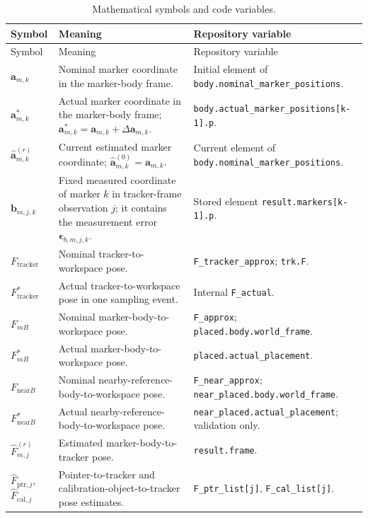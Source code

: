 \documentclass[11pt]{article}
\newcommand{\vct}[1]{\bm{#1}}
\begin{document}
\begingroup\small
\begin{longtable}{p{}p{}p{}}
\caption{Mathematical symbols and code variables.}\label{tab:symbols}\\
\toprule
Symbol & Meaning & Repository variable \\\midrule
\endfirsthead
\toprule Symbol & Meaning & Repository variable \\\midrule
\endhead
$\vct{a}_{m,k}$ & Nominal marker coordinate in the marker-body frame. & Initial element of \texttt{body.nominal\_marker\_positions}. \\\midrule
$\vct{a}_{m,k}^*$ & Actual marker coordinate in the marker-body frame; $\vct{a}_{m,k}^*=\vct{a}_{m,k}+\Delta\vct{a}_{m,k}$. & \texttt{body.actual\_marker\_positions[k-1].p}. \\\midrule
$\widehat{\vct{a}}_{m,k}^{(r)}$ & Current estimated marker coordinate; $\widehat{\vct{a}}_{m,k}^{(0)}=\vct{a}_{m,k}$. & Current element of \texttt{body.nominal\_marker\_positions}. \\\midrule
$\vct{b}_{m,j,k}$ & Fixed measured coordinate of marker $k$ in tracker-frame observation $j$; it contains the measurement error $\vct{\epsilon}_{b,m,j,k}$. & Stored element \texttt{result.markers[k-1].p}. \\\midrule
$F_{\mathrm{tracker}}$ & Nominal tracker-to-workspace pose. & \texttt{F\_tracker\_approx}; \texttt{trk.F}. \\\midrule
$F_{\mathrm{tracker}}^*$ & Actual tracker-to-workspace pose in one sampling event. & Internal \texttt{F\_actual}. \\\midrule
$F_{mB}$ & Nominal marker-body-to-workspace pose. & \texttt{F\_approx}; \texttt{placed.body.world\_frame}. \\\midrule
$F_{mB}^*$ & Actual marker-body-to-workspace pose. & \texttt{placed.actual\_placement}. \\\midrule
$F_{\mathrm{near}B}$ & Nominal nearby-reference-body-to-workspace pose. & \texttt{F\_near\_approx}; \texttt{near\_placed.body.world\_frame}. \\\midrule
$F_{\mathrm{near}B}^*$ & Actual nearby-reference-body-to-workspace pose. & \texttt{near\_placed.actual\_placement}; validation only. \\\midrule
$\widehat F_{m,j}^{(r)}$ & Estimated marker-body-to-tracker pose. & \texttt{result.frame}. \\\midrule
$\widehat F_{\mathrm{ptr},j}$, $\widehat F_{\mathrm{cal},j}$ & Pointer-to-tracker and calibration-object-to-tracker pose estimates. & \texttt{F\_ptr\_list[j]}, \texttt{F\_cal\_list[j]}. \\\midrule

\end{longtable}
\end{document}
